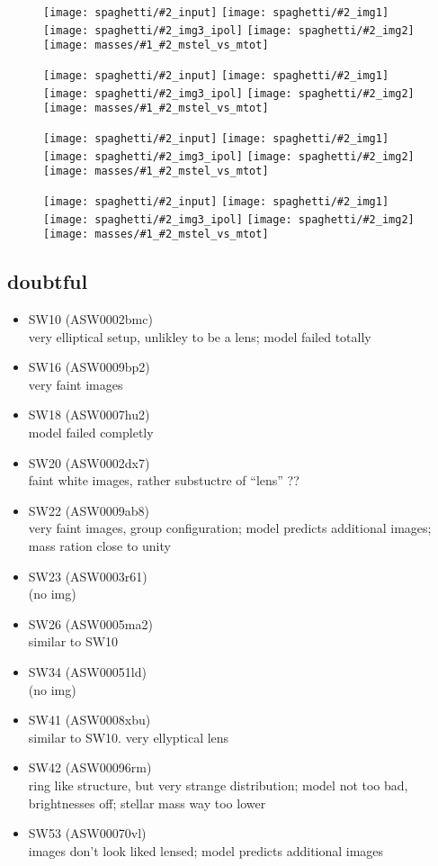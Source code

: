 \documentclass[fleqn,usenatbib]{mnras}
\newcommand{\inclfig}[2]{
  \centering
  \texttt{[image: spaghetti/\#2\_input]} %
  \texttt{[image: spaghetti/\#2\_img1]} \\
  \texttt{[image: spaghetti/\#2\_img3\_ipol]} %
  \texttt{[image: spaghetti/\#2\_img2]} \\
  \texttt{[image: masses/\#1\_\#2\_mstel\_vs\_mtot]}
}
\begin{document}
\begin{figure}
	\inclfig{SW05}{ASW0007k4r_AJIBCHQ6EM}
\end{figure}

\begin{figure}
	\inclfig{SW09}{ASW0002asp_5EKMWWVJHL}
\end{figure}

\begin{figure}
	\inclfig{SW28}{ASW0007xrs_JHC3J2HYV7}
\end{figure}

\begin{figure}
	\inclfig{SW29}{ASW0008qsm_TOFS7JNGEK}
\end{figure}




\subsection{doubtful}
\begin{itemize}
  \item SW10 (ASW0002bmc) \\
  very elliptical setup, unlikley to be a lens;
  model failed totally
  
  \item SW16 (ASW0009bp2) \\
  very faint images
  
  \item SW18 (ASW0007hu2) \\
  model failed completly
  
  \item SW20 (ASW0002dx7) \\
  faint white images, rather substuctre of ``lens'' ??
  
  \item SW22 (ASW0009ab8) \\
  very faint images, group configuration;
  model predicts additional images;
  mass ration close to unity
  
  \item SW23 (ASW0003r61) \\
  (no img)
  
  \item SW26 (ASW0005ma2) \\
  similar to SW10
  
  \item SW34 (ASW00051ld) \\
  (no img)
  
  \item SW41 (ASW0008xbu) \\
  similar to SW10. very ellyptical lens
  
  \item SW42 (ASW00096rm) \\
  ring like structure, but very strange distribution;
  model not too bad, brightnesses off;
  stellar mass way too lower
  
  \item SW53 (ASW00070vl) \\
  images don't look liked lensed;
  model predicts additional images
  
\end{itemize}
\end{document}
